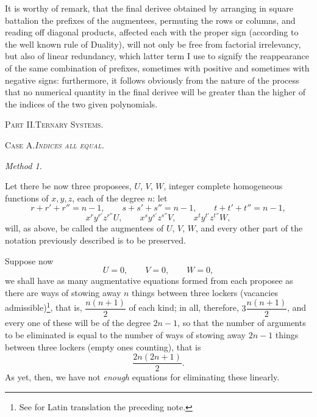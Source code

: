\documentclass[11pt]{article}
\newcommand{\sourcepage}[1]{\marginpar{\scriptsize p.~#1}}
\begin{document}
It is worthy of remark, that the final derivee obtained by arranging in square battalion the prefixes of the augmentees, permuting the rows or columns, and reading off diagonal products, affected each with the proper sign (according to the well known rule of Duality), will not only be free from factorial irrelevancy, but also of linear redundancy, which latter term I use to signify the reappearance of the same combination of prefixes, sometimes with positive and sometimes with negative signs: furthermore, it follows obviously from the nature of the process that no numerical quantity in the final derivee will be greater than the higher of the indices of the two given polynomials.

\begin{center}\scshape Part II.\quad Ternary Systems.\end{center}

\begin{center}\scshape Case A.\quad \emph{Indices all equal.}\end{center}

\begin{center}\itshape Method 1.\end{center}

Let there be now three proposees, $U$, $V$, $W$, integer complete homogeneous functions of $x,y,z$, each of the degree $n$: let
\[
 r+r'+r''=n-1,
 \qquad s+s'+s''=n-1,
 \qquad t+t'+t''=n-1,
\]
\[
 x^r y^{r'}z^{r''}U,
 \qquad x^s y^{s'}z^{s''}V,
 \qquad x^t y^{t'}z^{t''}W,
\]
will, as above, be called the augmentees of $U$, $V$, $W$, and every other part of the notation previously described is to be preserved.

\sourcepage{77}
Suppose now
\[
 U=0,\qquad V=0,\qquad W=0,
\]
we shall have as many augmentative equations formed from each proposee as there are ways of stowing away $n$ things between three lockers (vacancies admissible)\footnote{See for Latin translation the preceding note.}, that is, $\dfrac{n(n+1)}{2}$ of each kind; in all, therefore, $3\dfrac{n(n+1)}{2}$, and every one of these will be of the degree $2n-1$, so that the number of arguments to be eliminated is equal to the number of ways of stowing away $2n-1$ things between three lockers (empty ones counting), that is
\[
 \frac{2n(2n+1)}{2}.
\]
As yet, then, we have not \emph{enough} equations for eliminating these linearly.
\end{document}
